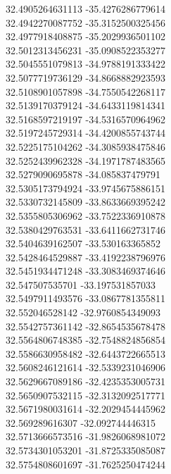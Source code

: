 {32.4905264631113	-35.4276286779614\\
32.4942270087752	-35.3152500325456\\
32.4977918408875	-35.2029936501102\\
32.5012313456231	-35.0908522353277\\
32.5045551079813	-34.9788191333422\\
32.5077719736129	-34.8668882923593\\
32.5108901057898	-34.7550542268117\\
32.5139170379124	-34.6433119814341\\
32.5168597219197	-34.5316570964962\\
32.5197245729314	-34.4200855743744\\
32.5225175104262	-34.3085938475846\\
32.5252439962328	-34.1971787483565\\
32.5279090695878	-34.085837479791\\
32.5305173794924	-33.9745675886151\\
32.5330732145809	-33.8633669395242\\
32.5355805306962	-33.7522336910878\\
32.5380429763531	-33.6411662731746\\
32.5404639162507	-33.530163365852\\
32.5428464529887	-33.4192238796976\\
32.5451934471248	-33.3083469374646\\
32.547507535701	-33.197531857033\\
32.5497911493576	-33.0867781355811\\
32.552046528142	-32.9760854349093\\
32.5542757361142	-32.8654535678478\\
32.5564806748385	-32.7548824856854\\
32.5586630958482	-32.6443722665513\\
32.5608246121614	-32.5339231046906\\
32.5629667089186	-32.4235353005731\\
32.5650907532115	-32.3132092517771\\
32.5671980031614	-32.2029454445962\\
32.569289616307	-32.092744446315\\
32.5713666573516	-31.9826068981072\\
32.5734301053201	-31.8725335085087\\
32.5754808601697	-31.7625250474244\\
}
